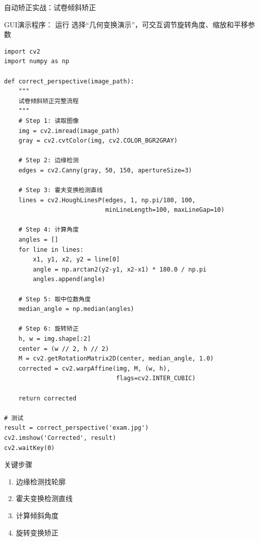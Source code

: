\begin{frame}[fragile]{自动矫正实战：试卷倾斜矫正}
	\begin{alertblock}{GUI演示程序：}
		运行  选择“几何变换演示”，可交互调节旋转角度、缩放和平移参数
	\end{alertblock}

    \begin{lstlisting}[basicstyle=\ttfamily\scriptsize]
import cv2
import numpy as np

def correct_perspective(image_path):
    """
    试卷倾斜矫正完整流程
    """
    # Step 1: 读取图像
    img = cv2.imread(image_path)
    gray = cv2.cvtColor(img, cv2.COLOR_BGR2GRAY)

    # Step 2: 边缘检测
    edges = cv2.Canny(gray, 50, 150, apertureSize=3)

    # Step 3: 霍夫变换检测直线
    lines = cv2.HoughLinesP(edges, 1, np.pi/180, 100,
                            minLineLength=100, maxLineGap=10)

    # Step 4: 计算角度
    angles = []
    for line in lines:
        x1, y1, x2, y2 = line[0]
        angle = np.arctan2(y2-y1, x2-x1) * 180.0 / np.pi
        angles.append(angle)

    # Step 5: 取中位数角度
    median_angle = np.median(angles)

    # Step 6: 旋转矫正
    h, w = img.shape[:2]
    center = (w // 2, h // 2)
    M = cv2.getRotationMatrix2D(center, median_angle, 1.0)
    corrected = cv2.warpAffine(img, M, (w, h),
                               flags=cv2.INTER_CUBIC)

    return corrected

# 测试
result = correct_perspective('exam.jpg')
cv2.imshow('Corrected', result)
cv2.waitKey(0)
    \end{lstlisting}

    \begin{alertblock}{关键步骤}
        \begin{enumerate}
            \item 边缘检测找轮廓
            \item 霍夫变换检测直线
            \item 计算倾斜角度
            \item 旋转变换矫正
        \end{enumerate}
    \end{alertblock}
\end{frame}

